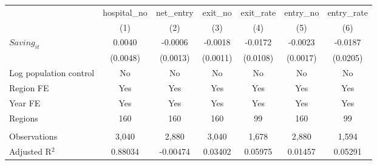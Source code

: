 \begingroup
\centering
\begin{tabular}{lcccccc}
   \toprule
                          & hospital\_no  & net\_entry  & exit\_no  & exit\_rate  & entry\_no  & entry\_rate \\    
                          & (1)           & (2)         & (3)       & (4)         & (5)        & (6)\\  
   \midrule 
   $Saving_{it}$          & 0.0040        & -0.0006     & -0.0018   & -0.0172     & -0.0023    & -0.0187\\   
                          & (0.0048)      & (0.0013)    & (0.0011)  & (0.0108)    & (0.0017)   & (0.0205)\\   
   Log population control & No            & No          & No        & No          & No         & No\\  
   Region FE              & Yes           & Yes         & Yes       & Yes         & Yes        & Yes\\  
   Year FE                & Yes           & Yes         & Yes       & Yes         & Yes        & Yes\\  
   Regions                & 160           & 160         & 160       & 99          & 160        & 99\\  
    \\
   Observations           & 3,040         & 2,880       & 3,040     & 1,678       & 2,880      & 1,594\\  
   Adjusted R$^2$         & 0.88034       & -0.00474    & 0.03402   & 0.05975     & 0.01457    & 0.05291\\  
   \bottomrule
\end{tabular}
\par\endgroup
